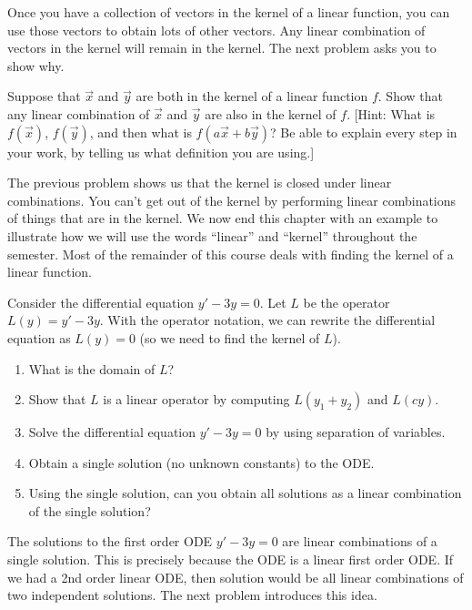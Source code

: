 Once you have a collection of vectors in the kernel of a linear function, you can use those vectors to obtain lots of other vectors. Any linear combination of vectors in the kernel will remain in the kernel.  The next problem asks you to show why.

\begin{problem}
 Suppose that $\vec x$ and $\vec y$ are both in the kernel of a linear function $f$.  Show that any linear combination of $\vec x$ and $\vec y$ are also in the kernel of $f$. [Hint: What is $f(\vec x)$, $f(\vec y)$, and then what is $f(a\vec x+b\vec y)$?  Be able to explain every step in your work, by telling us what definition you are using.]  
\end{problem}

The previous problem shows us that the kernel is closed under linear combinations. You can't get out of the kernel by performing linear combinations of things that are in the kernel.
We now end this chapter with an example to illustrate how we will use the words ``linear'' and ``kernel'' throughout the semester.  Most of the remainder of this course deals with finding the kernel of a linear function.

\begin{problem}
 Consider the differential equation $y'-3y=0$.  Let $L$ be the operator $L(y)=y'-3y$. With the operator notation, we can rewrite the differential equation as $L(y)=0$ (so we need to find the kernel of $L$).  
 \begin{enumerate}
 \item What is the domain of $L$?
 \item Show that $L$ is a linear operator by computing $L(y_1+y_2)$ and $L(cy)$.
 \item Solve the differential equation $y'-3y=0$ by using separation of variables. 
 \item Obtain a single solution (no unknown constants) to the ODE.
 \item Using the single solution, can you obtain all solutions as a linear combination of the single solution? 
 \end{enumerate}

\end{problem}

The solutions to the first order ODE $y'-3y=0$ are linear combinations of a single solution. This is precisely because the ODE is a linear first order ODE. If we had a 2nd order linear ODE, then solution would be all linear combinations of two independent solutions.  The next problem introduces this idea. 

